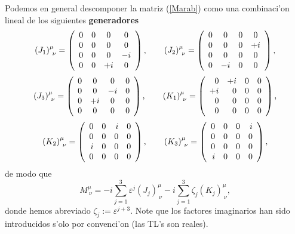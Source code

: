 Podemos en general descomponer la matriz (\ref{Marab}) como una combinaci'on
lineal de los siguientes \textbf{generadores}
\begin{equation}
\left(J_1\right)^\mu_{\ \nu}     =\left(
\begin{array}
[c]{cccc}
0 & 0 & 0 & 0\\
0 & 0 & 0 & 0\\
0 & 0 & 0 & -i\\
0 & 0 & +i & 0
\end{array}
\right), \qquad
\left(J_2\right)^\mu_{\ \nu}=\left(\begin{array}
[c]{cccc}
0 & 0 & 0 & 0\\
0 & 0 & 0 & +i\\
0 & 0 & 0 & 0\\
0 & -i & 0 & 0
\end{array}
\right),
\end{equation}
\begin{equation}
\left(J_3\right)^\mu_{\ \nu}=\left(
\begin{array}
[c]{cccc}
0 & 0 & 0 & 0\\
0 & 0 & -i & 0\\
0 & +i & 0 & 0\\
0 & 0 & 0 & 0
\end{array}
\right), \qquad
\left(K_1\right)^\mu_{\ \nu} =\left(
\begin{array}
[c]{rrrr}
0 & +i & 0 & 0\\
+i & 0 & 0 & 0\\
0 & 0 & 0 & 0\\
0 & 0 & 0 & 0
\end{array}
\right) ,
\end{equation}
\begin{equation}
\left(K_2\right)^\mu_{\ \nu}=\left(
\begin{array}
[c]{rrrr}
0 & 0 & i & 0\\
0 & 0 & 0 & 0\\
i & 0 & 0 & 0\\
0 & 0 & 0 & 0
\end{array}
\right), \qquad
\left(K_3\right)^\mu_{\ \nu}=\left(
\begin{array}
[c]{rrrr}
0 & 0 & 0 & i\\
0 & 0 & 0 & 0\\
0 & 0 & 0 & 0\\
i & 0 & 0 & 0
\end{array}
\right),
\end{equation}
de modo que
\begin{equation}
M^\mu_{\ \nu}= -i\sum_{j=1}^3\varepsilon^j\left(J_j\right)^\mu_{\
\nu}-i\sum_{j=1}^3\zeta_j\left(K_j\right)^\mu_{\ \nu}, \label{M}
\end{equation}
donde hemos abreviado $\zeta_j:=\varepsilon^{j+3}$. Note que los factores
imaginarios han sido introducidos s'olo por convenci'on (las TL's son reales).



